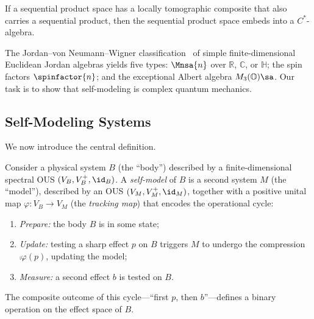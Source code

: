 \documentclass[11pt]{article}
\begin{document}
\begin{theorem}\label{thm:vdw3}
  If a sequential product space has a locally tomographic composite
  that also carries a sequential product, then the sequential product
  space embeds into a $C^{*}$-algebra.
\end{theorem}

The Jordan--von Neumann--Wigner
classification~\cite{JordanVonNeumannWigner1934} of simple
finite-dimensional Euclidean Jordan algebras yields five types:
$\Mnsa{n}$ over $\mathbb{R}$, $\mathbb{C}$, or $\mathbb{H}$; the
spin factors $\spinfactor{n}$; and the exceptional Albert algebra
$M_{3}(\mathbb{O})\sa$.  Our task is to show that self-modeling
is complex quantum mechanics.


\subsection{Self-Modeling Systems}
\label{sec:self-modeling}

We now introduce the central definition.

Consider a physical system $B$ (the ``body'') described by a
finite-dimensional spectral OUS $(V_{B}, V_{B}^{+}, \id_{B})$.  A
\emph{self-model} of $B$ is a second system $M$ (the ``model''),
described by an OUS $(V_{M}, V_{M}^{+}, \id_{M})$, together with a
positive unital map $\varphi: V_{B} \to V_{M}$ (the \emph{tracking
map}) that encodes the operational cycle:
\begin{enumerate}[label=(\roman*)]
  \item \emph{Prepare:} the body $B$ is in some state;
  \item \emph{Update:} testing a sharp effect $p$ on $B$ triggers
    $M$ to undergo the compression $\comp{\varphi(p)}$, updating
    the model;
  \item \emph{Measure:} a second effect $b$ is tested on $B$.
\end{enumerate}
The composite outcome of this cycle---``first $p$, then $b$''---defines
a binary operation on the effect space of $B$.
\end{document}

